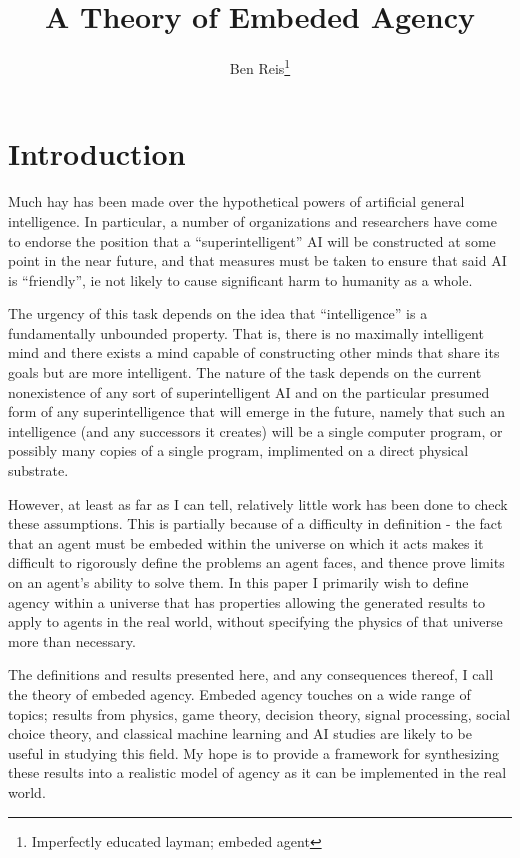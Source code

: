 \documentclass[12pt]{article}
\theoremstyle{definition}
\begin{document}
\title{A Theory of Embeded Agency}
\author{Ben Reis\footnote{Imperfectly educated layman; embeded agent}}
\maketitle

\section{Introduction}
Much hay has been made over the hypothetical powers of artificial general
intelligence. In particular, a number of organizations and researchers have come
to endorse the position that a ``superintelligent'' AI will be constructed at
some point in the near future, and that measures must be taken to ensure that
said AI is ``friendly'', ie not likely to cause significant harm to humanity as
a whole.

The urgency of this task depends on the idea that ``intelligence'' is a
fundamentally unbounded property. That is, there is no maximally intelligent
mind and there exists a mind capable of constructing other minds that share its
goals but are more intelligent. The nature of the task depends on the current
nonexistence of any sort of superintelligent AI and on the particular presumed
form of any superintelligence that will emerge in the future, namely that such
an intelligence (and any successors it creates) will be a single computer
program, or possibly many copies of a single program, implimented on a direct
physical substrate.

However, at least as far as I can tell, relatively little work has been done to
check these assumptions. This is partially because of a difficulty in definition
- the fact that an agent must be embeded within the universe on which it acts
makes it difficult to rigorously define the problems an agent faces, and thence
prove limits on an agent's ability to solve them. In this paper I primarily wish
to define agency within a universe that has properties allowing the generated
results to apply to agents in the real world, without specifying the physics of
that universe more than necessary.

The definitions and results presented here, and any consequences thereof, I call
the theory of embeded agency. Embeded agency touches on a wide range of topics;
results from physics, game theory, decision theory, signal processing, social
choice theory, and classical machine learning and AI studies are likely to be
useful in studying this field. My hope is to provide a framework for
synthesizing these results into a realistic model of agency as it can be
implemented in the real world.
\end{document}
